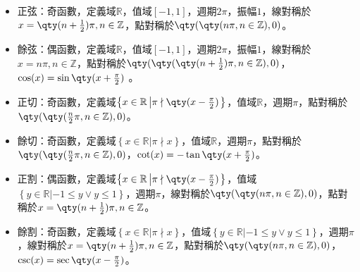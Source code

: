 \documentclass[a4paper,12pt]{report}
\begin{document}
\begin{itemize}
  \item 正弦：奇函數，定義域$\mathbb{R}$，值域$[-1,1]$，週期$2\pi$，振幅$1$，線對稱於$x=\qty(n+\frac{1}{2})\pi,n\in\mathbb{Z}$，點對稱於$\qty(\qty(n\pi,n\in\mathbb{Z}),0)$。
  \item 餘弦：偶函數，定義域$\mathbb{R}$，值域$[-1,1]$，週期$2\pi$，振幅$1$，線對稱於$x=n\pi,n\in\mathbb{Z}$，點對稱於$\qty(\qty(\qty(n+\frac{1}{2})\pi,n\in\mathbb{Z}),0)$，$\cos(x)=\sin\qty(x+\frac{\pi}{2})$ 。
  \item 正切：奇函數，定義域$\left\{x\in\mathbb{R}\left |\pi\nmid\qty(x-\frac{\pi}{2})\right.\right\}$，值域$\mathbb{R}$，週期$\pi$，點對稱於$\qty(\qty(\frac{n}{2}\pi,n\in\mathbb{Z}),0)$。
  \item 餘切：奇函數，定義域$\left\{x\in\mathbb{R}\left |\pi\nmid x\right.\right\}$，值域$\mathbb{R}$，週期$\pi$，點對稱於$\qty(\qty(\frac{n}{2}\pi,n\in\mathbb{Z}),0)$，$\cot(x)=-\tan\qty(x+\frac{\pi}{2})$。
  \item 正割：偶函數，定義域$\left\{x\in\mathbb{R}\left |\pi\nmid\qty(x-\frac{\pi}{2})\right.\right\}$，值域$\left\{y\in\mathbb{R}\left |-1\leq y \lor y\leq 1\right.\right\}$，週期$\pi$，線對稱於$\qty(\qty(n\pi,n\in\mathbb{Z}),0)$，點對稱於$x=\qty(n+\frac{1}{2})\pi,n\in\mathbb{Z}$。
  \item 餘割：奇函數，定義域$\left\{x\in\mathbb{R}\left |\pi\nmid x\right.\right\}$，值域$\left\{y\in\mathbb{R}\left |-1\leq y \lor y\leq 1\right.\right\}$，週期$\pi$，線對稱於$x=\qty(n+\frac{1}{2})\pi,n\in\mathbb{Z}$，點對稱於$\qty(\qty(n\pi,n\in\mathbb{Z}),0)$，$\csc(x)=\sec\qty(x-\frac{\pi}{2})$。
\end{itemize}
\renewcommand{\arraystretch}{1.5}
\end{document}
